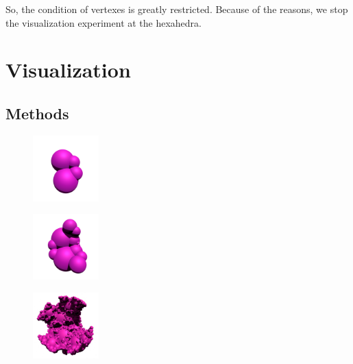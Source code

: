 \documentclass[suppldata, dvipdfmx]{interact}
\theoremstyle{plain}%
\theoremstyle{definition}
\theoremstyle{remark}
\theoremstyle{problemstyle}
\begin{document}
So, the condition of vertexes is greatly restricted.
Because of the reasons, we stop the visualization experiment at the hexahedra.

\section{Visualization}

\subsection{Methods}

\begin{figure}[H]
 \begin{minipage}[t]{0.18\textwidth}
  \centering
  \includegraphics[width=1in, height=1in, keepaspectratio]{./img/visualization/sphereStep1.png}
  \label{}
 \end{minipage}
 \hspace*{\fill}
 \begin{minipage}[t]{0.18\textwidth}
  \centering
  \includegraphics[width=1in, height=1in, keepaspectratio]{./img/visualization/sphereStep2.png}
  \label{}
 \end{minipage}
 \hspace*{\fill}
 \begin{minipage}[t]{0.18\textwidth}
  \centering
  \includegraphics[width=1in, height=1in, keepaspectratio]{./img/visualization/sphereStep5.png}
  \label{}
 \end{minipage}
 \hspace*{\fill}
 \begin{minipage}[t]{0.18\textwidth}

\end{minipage}
\end{figure}
\end{document}
